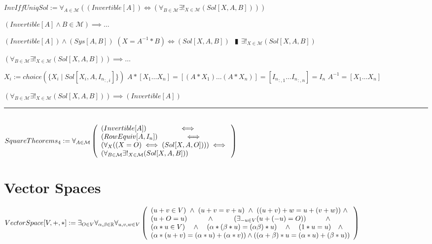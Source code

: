 \documentclass{book}
\newcommand{\abr}{:=}
\newcommand{\pipe}{$\phantom{(}\vrectangleblack\phantom{)}$}
\newcommand{\st}{\mathbin{|}}
\begin{document}
$InvIffUniqSol \abr \forall_{A \in \mathcal{M}}((Invertible[A]) \iff (\forall_{B \in \mathcal{M}} \exists!_{X \in \mathcal{M}}(Sol[X, A, B])))$
\begin{enumerate}
  \lit $(Invertible[A] \land B \in \mathcal{M}) \implies \ldots$
  \begin{enumerate}
    \lit $(Invertible[A]) \land (Sys[A, B])$
    \lit $(X = A^{-1} * B) \iff (Sol[X, A, B])$ \pipe $\exists!_{X \in \mathcal{M}}(Sol[X, A, B])$
  \end{enumerate}
  \lit $(\forall_{B \in \mathcal{M}} \exists!_{X \in \mathcal{M}}(Sol[X, A, B])) \implies \ldots$
  \begin{enumerate}
    \lit $X_i \abr choice(\{X_i \st Sol[X_i, A, {I_n}_{:, i}]\})$
    \lit $A * [X_1 \ldots X_n] = [(A * X_1) \ldots (A * X_n)] =  [{I_n}_{:, 1} \ldots {I_n}_{:, n}] = I_n$ \lit $A^{-1} = [X_1 \ldots X_n]$
  \end{enumerate}
  \lit $(\forall_{B \in \mathcal{M}} \exists!_{X \in \mathcal{M}}(Sol[X, A, B])) \implies (Invertible[A])$
\end{enumerate} \vspace{.75mm} \hrule \vspace{.75mm} \ \\ 

$SquareTheorems_4 \abr \forall_{A \in \mathcal{M}}\left(\begin{array}{ll}
  (Invertible[A]) \hfill \iff \hfill \\
  (RowEquiv[A, I_n]) \hfill \iff \hfill \\
  (\forall_{X}((X = O) \iff (Sol[X, A, O]))) \hfill \iff \hfill \\
  (\forall_{B \in \mathcal{M}} \exists!_{X \in \mathcal{M}}(Sol[X, A, B]))
\end{array}\right)$ \\


\section{Vector Spaces}
$VectorSpace[V, +, *] \abr \exists_{O \in V} \forall_{\alpha ,\beta \in \mathbb{R}} \forall_{u, v, w \in V} \left(\begin{array}{ll}
  (u + v \in V) \hfill \land \hfill (u + v = v + u) \hfill \land \hfill ((u + v) + w = u + (v + w)) \hfill \land \hfill \\
  (u + O = u) \hfill \land \hfill (\exists_{-u \in V}(u + (-u) = O)) \hfill \land \hfill \\
  (\alpha * u \in V) \hfill \land \hfill (\alpha * (\beta * u) = (\alpha \beta) * u) \hfill \land \hfill (1 * u = u) \hfill \land \hfill \\
  (\alpha * (u + v) = (\alpha * u) + (\alpha * v))  \hfill \land \hfill ((\alpha + \beta) * u = (\alpha * u) + (\beta * u)) \\
\end{array}\right)$
\end{document}
